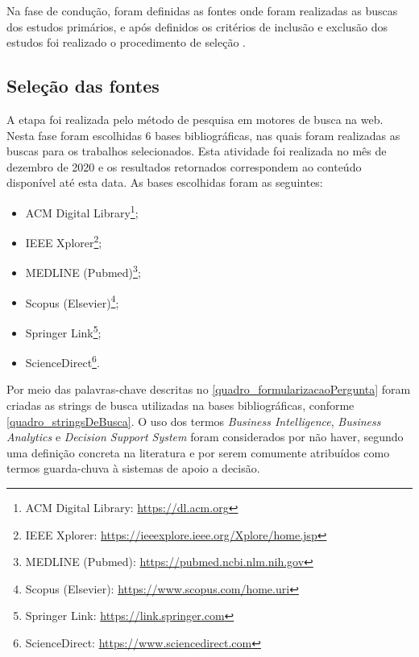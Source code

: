 Na fase de condução, foram definidas as fontes onde foram realizadas as buscas dos estudos primários, e após definidos os critérios de inclusão e exclusão dos estudos foi realizado o procedimento de seleção \cite{biolchini2005}. 


\subsection{Seleção das fontes}

A etapa foi realizada pelo método de pesquisa em motores de busca na web. Nesta fase foram escolhidas 6 bases bibliográficas, nas quais foram realizadas as buscas para os trabalhos selecionados. Esta atividade foi realizada no mês de dezembro de 2020 e os resultados retornados correspondem ao conteúdo disponível até esta data. As bases escolhidas foram as seguintes:
\begin{itemize}
 \item ACM Digital Library\footnote{ACM Digital Library: \url{https://dl.acm.org}};
 \item IEEE Xplorer\footnote{IEEE Xplorer: \url{https://ieeexplore.ieee.org/Xplore/home.jsp}};
 \item MEDLINE (Pubmed)\footnote{MEDLINE (Pubmed): \url{https://pubmed.ncbi.nlm.nih.gov}};
 \item Scopus (Elsevier)\footnote{Scopus (Elsevier): \url{https://www.scopus.com/home.uri}};
 \item Springer Link\footnote{Springer Link: \url{https://link.springer.com}};
 \item ScienceDirect\footnote{ScienceDirect: \url{https://www.sciencedirect.com}}.
\end{itemize}

Por meio das palavras-chave descritas no \autoref{quadro_formularizacaoPergunta} foram criadas as strings de busca utilizadas na bases bibliográficas, conforme \autoref{quadro_stringsDeBusca}. O uso dos termos \textit{Business Intelligence}, \textit{Business Analytics} e \textit{Decision Support System} foram considerados por não haver, segundo  uma definição concreta na literatura e por serem comumente atribuídos como termos guarda-chuva à sistemas de apoio a decisão. 

